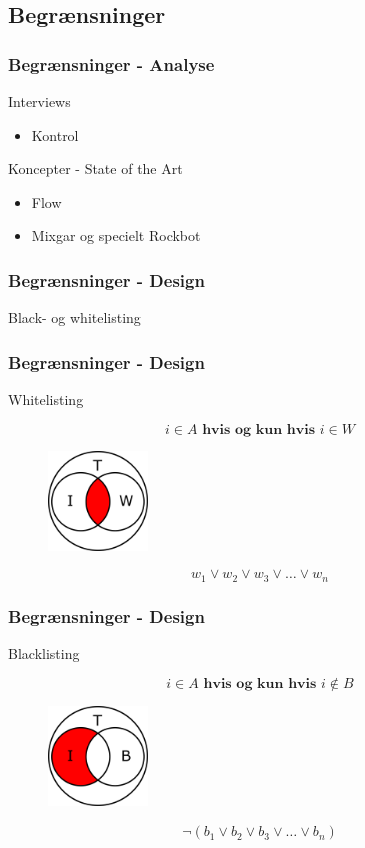 \subsection{Begrænsninger}
\begin{frame}
	\frametitle{Begrænsninger - Analyse}
	Interviews
	\begin{itemize}
		\item Kontrol
	\end{itemize}
	Koncepter - State of the Art
	\begin{itemize}
		\item Flow
		\item Mixgar og specielt Rockbot
	\end{itemize}
\end{frame}

\begin{frame}
	\frametitle{Begrænsninger - Design}
	Black- og whitelisting
\end{frame}

\begin{frame}
	\frametitle{Begrænsninger - Design}
	Whitelisting
	
	\begin{equation}
		i \in A \textbf{ hvis og kun hvis } i \in W
	\end{equation}
	
	\begin{figure}
    \centering
    \includegraphics[width=100px]{slides/Jens/whitelist}
  \end{figure}
	
	\begin{equation}
		w_1 \vee w_2 \vee w_3 \vee \dots \vee w_n
	\end{equation}
\end{frame}

\begin{frame}
	\frametitle{Begrænsninger - Design}
	Blacklisting
	
	\begin{equation}
		i \in A \textbf{ hvis og kun hvis } i \notin B
	\end{equation}
	
	\begin{figure}
    \centering
    \includegraphics[width=100px]{slides/Jens/blacklist}
  \end{figure}
	
	\begin{equation}
		\neg(b_1 \vee b_2 \vee b_3 \vee \dots \vee b_n)
	\end{equation}
\end{frame}

